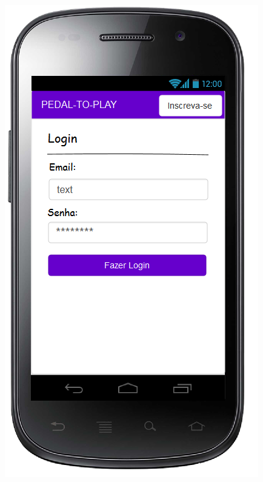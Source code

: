 \begin{figure}
\centering
\begin{minipage}{.5\textwidth}
  \centerline{\includegraphics[width=0.7\linewidth]{figuras/Login.png}}
  \label{fig:loginProto}
\end{minipage}%
\begin{minipage}{.5\textwidth}

\end{minipage}
\end{figure}
